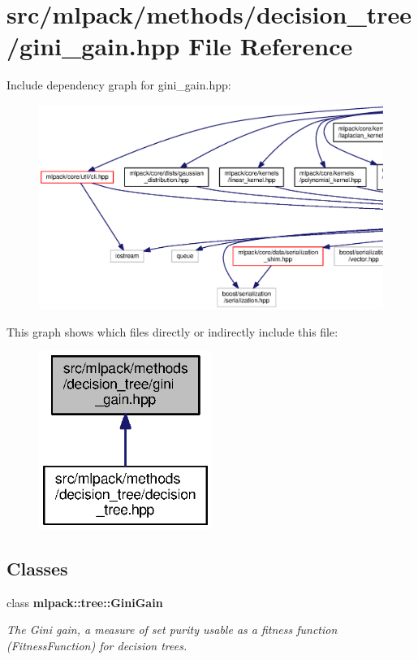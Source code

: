 \section{src/mlpack/methods/decision\+\_\+tree/gini\+\_\+gain.hpp File Reference}
\label{gini__gain_8hpp}
Include dependency graph for gini\+\_\+gain.\+hpp\+:
\nopagebreak
\begin{figure}[H]
\begin{center}
\leavevmode
\includegraphics[width=350pt]{gini__gain_8hpp__incl}
\end{center}
\end{figure}
This graph shows which files directly or indirectly include this file\+:
\nopagebreak
\begin{figure}[H]
\begin{center}
\leavevmode
\includegraphics[width=160pt]{gini__gain_8hpp__dep__incl}
\end{center}
\end{figure}
\subsection*{Classes}
\begin{DoxyCompactItemize}
\item 
class {\bf mlpack\+::tree\+::\+Gini\+Gain}
\begin{DoxyCompactList}\small\item\em The Gini gain, a measure of set purity usable as a fitness function (Fitness\+Function) for decision trees. \end{DoxyCompactList}\end{DoxyCompactItemize}

